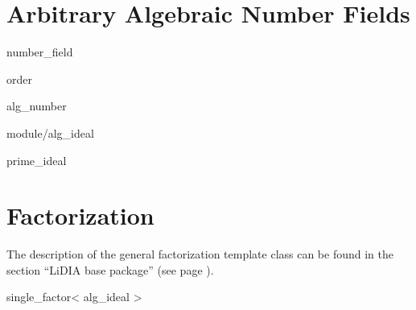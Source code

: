 \chapter{Arbitrary Algebraic Number Fields}

\begin{class}{number_field}
  
\end{class}

\begin{class}{order}
  
\end{class}

\begin{class}{alg_number}
  
\end{class}

\begin{class}{module/alg_ideal}
  
\end{class}

\begin{class}{prime_ideal}
  
\end{class}


\chapter{Factorization}

The description of the general factorization template class can be found in the section ``LiDIA
base package'' (see page \pageref{LiDIA-base:factorization}).

\begin{class}{single_factor< alg_ideal >}
  
\end{class}
